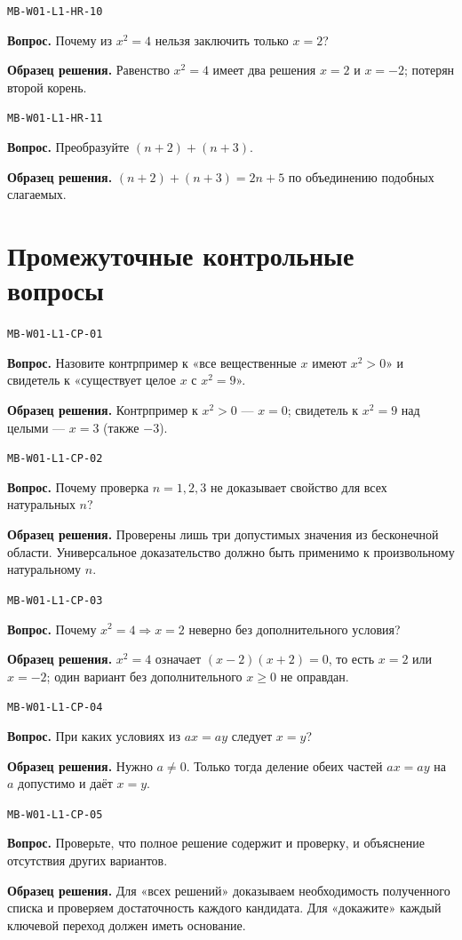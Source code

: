 \documentclass[11pt,a4paper,openany]{book}
\newcommand{\muid}[1]{\texttt{\footnotesize #1}}
\begin{document}
\noindent\muid{MB-W01-L1-HR-10}\par \textbf{Вопрос.} Почему из $x^2=4$ нельзя заключить только $x=2$?\par 
\textbf{Образец решения.} Равенство $x^2=4$ имеет два решения $x=2$ и $x=-2$; потерян второй корень.\medskip

\noindent\muid{MB-W01-L1-HR-11}\par \textbf{Вопрос.} Преобразуйте $(n+2)+(n+3)$.\par 
\textbf{Образец решения.} $(n+2)+(n+3)=2n+5$ по объединению подобных слагаемых.\medskip

\section{Промежуточные контрольные вопросы}

\noindent\muid{MB-W01-L1-CP-01}\par \textbf{Вопрос.} Назовите контрпример к «все вещественные $x$ имеют $x^2>0$» и свидетель к «существует целое $x$ с $x^2=9$». \par 
\textbf{Образец решения.} Контрпример к $x^2>0$ — $x=0$; свидетель к $x^2=9$ над целыми — $x=3$ (также $-3$).\medskip

\noindent\muid{MB-W01-L1-CP-02}\par \textbf{Вопрос.} Почему проверка $n=1,2,3$ не доказывает свойство для всех натуральных $n$?\par 
\textbf{Образец решения.} Проверены лишь три допустимых значения из бесконечной области. Универсальное доказательство должно быть применимо к произвольному натуральному $n$.\medskip

\noindent\muid{MB-W01-L1-CP-03}\par \textbf{Вопрос.} Почему $x^2=4\Rightarrow x=2$ неверно без дополнительного условия?\par 
\textbf{Образец решения.} $x^2=4$ означает $(x-2)(x+2)=0$, то есть $x=2$ или $x=-2$; один вариант без дополнительного $x\ge0$ не оправдан.\medskip

\noindent\muid{MB-W01-L1-CP-04}\par \textbf{Вопрос.} При каких условиях из $ax=ay$ следует $x=y$?\par 
\textbf{Образец решения.} Нужно $a\ne0$. Только тогда деление обеих частей $ax=ay$ на $a$ допустимо и даёт $x=y$.\medskip

\noindent\muid{MB-W01-L1-CP-05}\par \textbf{Вопрос.} Проверьте, что полное решение содержит и проверку, и объяснение отсутствия других вариантов.\par 
\textbf{Образец решения.} Для «всех решений» доказываем необходимость полученного списка и проверяем достаточность каждого кандидата. Для «докажите» каждый ключевой переход должен иметь основание.\medskip
\end{document}
